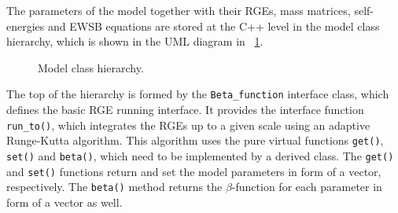 \documentclass[final,3p,11pt,pdflatex]{elsarticle}
\newcommand{\code}[1]{\lstinline|#1|}  %
\newcommand{\textoverline}[1]{$\overline{\mbox{#1}}$}
\newcommand{\DRbar}{\textoverline{DR}\xspace}
\newcommand{\figref}[1]{\figurename~\ref{#1}}
\begin{document}
The parameters of the model together with their RGEs, mass
matrices, self-energies and EWSB equations are stored at the C++ level
in the model class hierarchy, which is shown in the UML diagram in
\figref{fig:parameter-classes}.
%
\begin{figure}
  \centering
  \caption{Model class hierarchy.}
  \label{fig:parameter-classes}
\end{figure}

The top of the hierarchy is formed by the \code{Beta_function}
interface class, which defines the basic RGE running interface.  It
provides the interface function \code{run_to()}, which integrates the
RGEs up to a given scale using an adaptive Runge-Kutta algorithm.
This algorithm uses the pure virtual functions \code{get()},
\code{set()} and \code{beta()}, which need to be implemented by a
derived class.  The \code{get()} and \code{set()} functions return and
set the model parameters in form of a vector, respectively.  The
\code{beta()} method returns the $\beta$-function for each parameter
in form of a vector as well.
\end{document}
